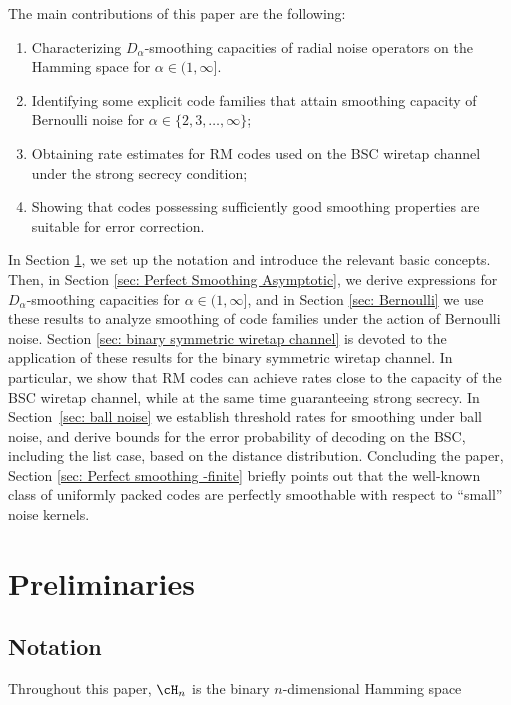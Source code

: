 \documentclass{amsart}
\theoremstyle{remark}
\begin{document}
\vspace*{.05in} The main contributions of this paper are the following:
\begin{enumerate}
    \item Characterizing $D_{\alpha}$-smoothing capacities of radial noise operators on the Hamming space for {$\alpha \in (1,\infty]$.}
    \item Identifying some explicit code families that attain smoothing capacity of Bernoulli noise for $\alpha \in \{2,3,\dots,\infty\}$; 
    \item Obtaining rate estimates for RM codes used on the BSC wiretap channel under the strong secrecy condition;
    \item Showing that codes possessing sufficiently good smoothing properties are suitable for error correction.
\end{enumerate}

In Section \ref{sec: Prelimnaries}, we set up the notation and introduce the relevant basic concepts. Then, in Section \ref{sec: Perfect Smoothing Asymptotic}, we derive expressions for $D_{\alpha}$-smoothing capacities for $\alpha \in (1,\infty]$, and in Section \ref{sec: Bernoulli} we use these results to analyze smoothing of code families under the action of Bernoulli noise. 
Section \ref{sec: binary symmetric wiretap  channel} is devoted to the application of these results for the binary symmetric wiretap channel. In particular, we show that RM codes can achieve rates close to the capacity of the BSC wiretap channel, while at the same time guaranteeing strong secrecy. 
In Section~\ref{sec: ball noise} we establish threshold rates for smoothing under ball noise, and derive bounds for the error probability of decoding on the BSC, including the list case, based on the distance distribution. Concluding the paper, Section \ref{sec: Perfect smoothing -finite} briefly points out that the well-known class of uniformly packed codes are perfectly smoothable with respect to ``small'' noise kernels.

\section{Preliminaries}\label{sec: Prelimnaries}

\subsection{Notation}
Throughout this paper, $\cH_n$ is the binary $n$-dimensional Hamming space
\end{document}
